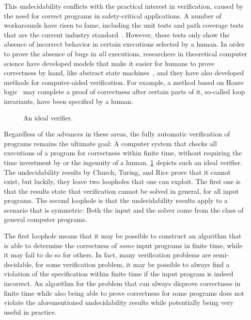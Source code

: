 \documentclass[../../diss.tex]{subfiles}
\begin{document}
This undecidability conflicts with the practical interest in verification, caused by the need for correct programs in safety-critical applications.
A number of workarounds have risen to fame, including the unit tests and path coverage tests that are the current industry standard~\cite{Beizer90,MyersSB12}.
However, these tests only show the absence of incorrect behavior in certain executions selected by a human.
In order to prove the absence of bugs in \emph{all} executions, researchers in theoretical computer science have developed models that make it easier for humans to prove correctness by hand, like abstract state machines~\cite{Gurevich00,Borger97}, and they have also developed methods for computer-aided verification.
For example, a method based on Hoare logic~\cite{Hoare69} may complete a proof of correctness after certain parts of it, so-called loop invariants, have been specified by a human.

\begin{figure}[t]
    \centering%
    \caption{An ideal verifier.}%
    \label{Figure:IntroVerification}%
\end{figure}

Regardless of the advances in these areas, the fully automatic verification of programs remains the ultimate goal: A computer system that checks all executions of a program for correctness within finite time, without requiring the time investment by or the ingenuity of a human.
\cref{Figure:IntroVerification} depicts such an ideal verifier.
The undecidability results by Church, Turing, and Rice prove that it cannot exist, but luckily, they leave two loopholes that one can exploit.
The first one is that the results state that verification cannot be solved in general, \ie for all input programs.
The second loophole is that the undecidability results apply to a scenario that is symmetric: Both the input and the solver come from the class of general computer programs.

The first loophole means that it may be possible to construct an algorithm that is able to determine the correctness of \emph{some} input programs in finite time, while it may fail to do so for others.
In fact, many verification problems are semi-decidable, \eg for some verification problem, it may be possible to always find a violation of the specification within finite time if the input program is indeed incorrect.
An algorithm for the problem that can always disprove correctness in finite time while also being able to prove correctness for some programs does not violate the aforementioned undecidability results while potentially being very useful in practice.
\end{document}
